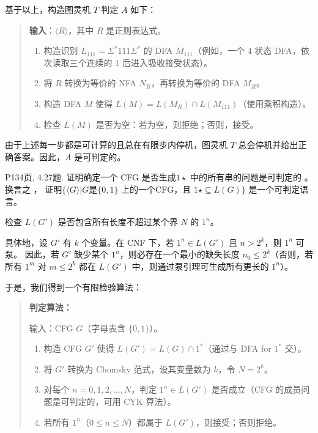 \documentclass[11pt,addpoints,answers]{exam}
\begin{document}
\begin{questions}
\begin{solution}
        基于以上，构造图灵机 $T$ 判定 $A$ 如下：
        
        \begin{quote}
        \textbf{输入}：$\langle R \rangle$，其中 $R$ 是正则表达式。
        
        \begin{enumerate}
            \item 构造识别 $L_{111} = \Sigma^*111\Sigma^*$ 的 DFA $M_{111}$（例如，一个 4 状态 DFA，依次读取三个连续的 1 后进入吸收接受状态）。
            \item 将 $R$ 转换为等价的 NFA $N_R$，再转换为等价的 DFA $M_R$。
            \item 构造 DFA $M$ 使得 $L(M) = L(M_R) \cap L(M_{111})$（使用乘积构造）。
            \item 检查 $L(M)$ 是否为空：若为空，则拒绝；否则，接受。
        \end{enumerate}
        \end{quote}
        
        由于上述每一步都是可计算的且总在有限步内停机，图灵机 $T$ 总会停机并给出正确答案。因此，$A$ 是可判定的。
	\end{solution}
	
	
	\question P134页, 4.27题.
	证明确定一个 CFG 是否生成$1\star$ 中的所有串的问题是可判定的 。换言之 ， 证明$\{\langle G
	\rangle |G\text{是}\{0,1\}\text{ 上的一个CFG，且 }1\star\subseteq L(G)\}$ 是一个可判定语言。
	\begin{solution}
		检查 $L(G')$ 是否包含所有长度不超过某个界 $N$ 的 $1^n$。

        具体地，设 $G'$ 有 $k$ 个变量。在 CNF 下，若 $1^n \in L(G')$ 且 $n > 2^k$，则 $1^n$ 可泵。  
        因此，若 $G'$ 缺少某个 $1^n$，则必存在一个最小的缺失长度 $n_0 \leq 2^k$（否则，若所有 $1^m$ 对 $m \leq 2^k$ 都在 $L(G')$ 中，则通过泵引理可生成所有更长的 $1^n$）。
        
        于是，我们得到一个有限检验算法：
        
        \begin{quote}
        \textbf{判定算法：}
        
        输入：CFG $G$（字母表含 $\{0,1\}$）。
        
        \begin{enumerate}
            \item 构造 CFG $G'$ 使得 $L(G') = L(G) \cap 1^*$（通过与 DFA for $1^*$ 交）。
            \item 将 $G'$ 转换为 Chomsky 范式，设其变量数为 $k$，令 $N = 2^k$。
            \item 对每个 $n = 0, 1, 2, \dots, N$，判定 $1^n \in L(G')$ 是否成立（CFG 的成员问题是可判定的，可用 CYK 算法）。
            \item 若所有 $1^n$（$0 \leq n \leq N$）都属于 $L(G')$，则接受；否则拒绝。
        \end{enumerate}
        \end{quote}
	\end{solution}  
	

\end{questions}
\end{document}
